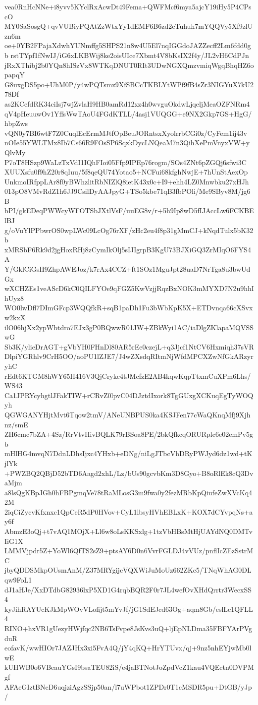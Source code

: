 vea0RnHcNNe+i8yvv5KYclRxAcwDt49Fema+QWFMcf6mya5ajcY19iHy5P4CPscO
MY0SaSosgQ+qvVUBiyPQAtZzWtxYy1dEMF6B6zd2cTuhuh7mYQQVy5Xf9zlUzn6m
oe+0YB2FPajaXdwhYUNmffg5SHPS21n8w4U5El7nqIGGdoJAZZecff2Lm6fdd0gb
rstTYpf1fNwIJ/iG6xLKBWij8ke2oisUIce7Xbmt4V8bKsIX2f4y/JL2vH6CdPJn
jRxXThibj2b0YQn8hISzVx8WTKqDNUT0RIt3UDwNGXQmzvmiqWgqBhqHZ6opapqY
G8uxgDS5po+UhM0P/y4wPQTsmz9XfSBCcTKBLYtWPf9fB4sZr3NIGYuX7kU278Df
as2KCefdRK34ciIsj7wjZvlaH9HB0amRd12xz4h0wvguOkdwLjqeljMeaOZFNRm4
qV4pHeuuwOv1YffsWwTAoU4FGdKTLL/4asj1VUQGG+e9NX2Gkp7GS+HgG/hbpZws
vQN0y7BI6wtF7Z0CuqlEcErmMJtfOpBeuJORntsxXyolrrbCGi0z/CyFem1ij43v
nOIe55YWLTMx8Ib7Cs66R9FOsSP6SqzkDycLNQeaM7n3QihXePmVnyxVW+yQlvMy
P7oT8HSzp9WaLzTxVdI1IQhFIoi05Ffp9IPEp76rogm/SOs4ZNt6pZGQj6sfwi3C
XUUXsfu0f9hZ20r8qIuu/5f8qeQU74Yotao5+NCFui68kfghNwjE+7hUnStAexOp
UnkmoIRfppLAr8f0yBWhzlitRbNIZlQ8ietK43x0c+I9+ehh4LZ0Mnwbku27xHJh
013pO8VMvRdZ1h6JJ9CsilDyAAJpyG+TSo5kbe71qB3fbPOli/Me9SByv8M/jg6B
bPI/gkEDeqPWWcyWFOTSbJXtlVsF/uuEG8v/r+5h9Ip8wD5fIJAccLw6FCKBElBJ
g/oVuYlPPbwrOS0wpLWc09LcOg76rXF/zHc2eu4f8p31gMmCJ+kNqdTulx5bK32b
xMRSbF6Rk9d2jgHoxRHj8zCymIkOlj5sIJIgrpB3KgU73BJXiGQ3ZrMIqO6FYS4A
Y/GklCiGsH9ZhpAWEJoz/k7rAx4CCZ+ft1SOz1MguJpt28uaD7NrTga8u3bwUdGx
wXCHZEs1veAScD6kC0QILFYOe9qFGZ5KwVzjjRqzBxNOK3mMYXD7N2u9hhIhUyz8
WO0lwDfl7DImGFcp3WQQfkR+sqB1paDh1Fu3bWbKpK5X+ETDvnqa66cXSvxw2kxX
ilO06hjXx2ypWbtdro7EJx3gP0BQwwR01JW+ZBkWyi1AC/iaDlgZKlapaMQVSSwG
Sb3K/ylieDrAGT+gVbYH0FHnDl80AR5rEe0czejL+q3Jjcf1NtCV6Hxmiqh37sVR
DlpiYGRhlv9CrH5OO/aoPU1lZJE7/J4wZXsdqRItmNjWfdMPCXZwNfGkARzyryhC
rEdt6KTGM8hWY65H416V3QjCrykc4tJMcfzE2AB4kqwKqpTtxmCuXPm6Lhs/WS43
Ca1JPRYcyhgtlJFakTIW+rCRvZ0lpvC04DJztdIxork8TgGUxgXCKuqEgTyWOQyh
QGWGANYHjtMvt6Tqow2tmV/ANeUNBPUS0ka4KSJFen77cWaQKnqMfj9Xjhnz/smE
ZH6cmc7bZA+4Sz/RrVtvHivBQLK79rBSoa8PE/2bkQfkcqORURplc6e02emPv5gb
mHlHG4mvqN7DdnLDhsIjxc4YHxb+eDNg/niLgJTbcVhDRyPWJyd6dz1wd+tKjlYk
+PWZBQ2QBjD52bTD6Aagd2xhL/Lz/bUs90gcvbKm3D8Gyo+B8oRlEk8cQ3DvaMjm
a8lsQgKBpJGh0hFBPgmqVe78tRaMLosG3m9fwa0y2fezMRbKpQiufeZwXVcKq42M
2iqCiZycvKfxnxc1QpCeR5dP0HVov+CyL1lbsyHVhEBLxK+KOX7dCYvpqNs+ay6f
AbmzE3oQj+t7vAQ1MOjX+Ll6w8oLsKKSxlg+1tzVbHBsMtHjUAYdNQ0DMTvIiG1X
LMMVjpdr5Z+YoWl6QfTS2sZ9+ptsAY6D0n6VvrFGLDJ4vVUz/pnflIcZEzSstrMC
jbyQDDSMkpOUsmAnM/Z37MRYgijcVQXWiJuMoUz662ZKe5/TNqWhAG0DLqw9FoL1
dJ1aHJe/XxDTdbG82936lxP5XD1G4rqbBQR2F0r7JL4wefOvXHdQrrtr3WecxSS4
kyJihRAYUcKJkMpWOvVLofijt5mYvJf/jG1SdEJcd63Og+aqm8Gb/eslLc1QFLL4
RINO+hxVR1gUezyHWjfqc2NB6TsFvpe8JsKvs3uQ+ljEpNLDma35FBFYArPVgduR
eofavK/wwHIOr7JAZJHx3xi5FvA4Q/jY4qKQ+HrYTUvx/qj+9nz5nhEYjwMb0lwE
kUHWB0o6VBeauYGsI9bsaTEU82iS/e4jaBTNotJoZpdVcZ1kau4VQEctn0DVPMgf
AFAeGIztBNcD6uqjziAgzSSjp50an/l7uWPbot1ZPDr0T1cMSDR5pu+DtGB/yJp/
